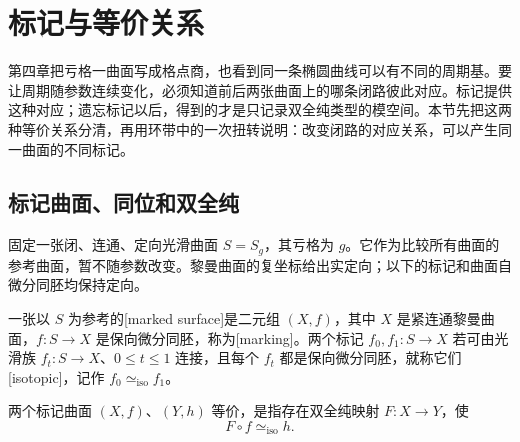 
% 
% 
% 
% 
% 

\section{标记与等价关系}
\label{g4:sec:0601}

第四章把亏格一曲面写成格点商，也看到同一条椭圆曲线可以有不同的周期基。要让周期随参数连续变化，必须知道前后两张曲面上的哪条闭路彼此对应。标记提供这种对应；遗忘标记以后，得到的才是只记录双全纯类型的模空间。本节先把这两种等价关系分清，再用环带中的一次扭转说明：改变闭路的对应关系，可以产生同一曲面的不同标记。

\subsection{标记曲面、同位和双全纯}
\label{g4:subsec:0601:01}

固定一张闭、连通、定向光滑曲面 \(S=S_g\)，其亏格为 \(g\)。它作为比较所有曲面的参考曲面，暂不随参数改变。黎曼曲面的复坐标给出实定向；以下的标记和曲面自微分同胚均保持定向。

\begin{definition}\label{g4:def:0601:marked-surface}
	一张以 \(S\) 为参考的[marked surface]是二元组 \((X,f)\)，其中 \(X\) 是紧连通黎曼曲面，\(f:S\to X\) 是保向微分同胚，称为[marking]。两个标记 \(f_0,f_1:S\to X\) 若可由光滑族 \(f_t:S\to X\)、\(0\le t\le1\) 连接，且每个 \(f_t\) 都是保向微分同胚，就称它们[isotopic]，记作 \(f_0\simeq_{\mathrm{iso}}f_1\)。

	两个标记曲面 \((X,f)\)、\((Y,h)\) 等价，是指存在双全纯映射 \(F:X\to Y\)，使
	\begin{equation}\label{g4:eq:0601:marked-equivalence}
		F\circ f\simeq_{\mathrm{iso}}h.
	\end{equation}
\end{definition}

